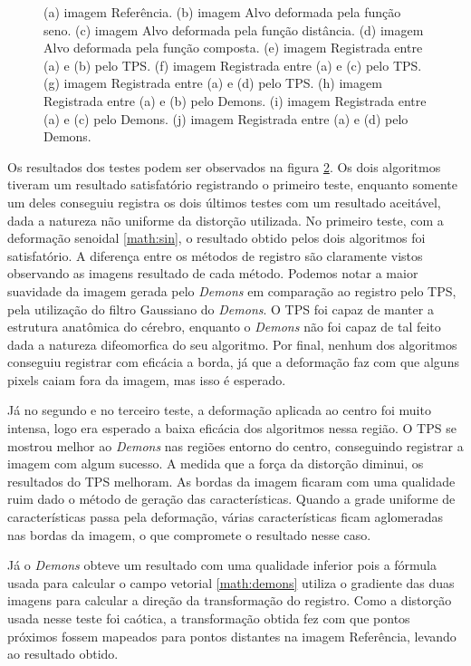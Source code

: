 \begin{figure}[h]
\begin{subfigure}[t]{0.25\textwidth}
	  \label{fig:sindist-image-demon}
	\end{subfigure}
	\caption{(a) imagem Referência. (b) imagem Alvo deformada pela função seno. (c) imagem Alvo deformada pela função 
			distância. (d) imagem Alvo deformada pela função composta. (e) imagem Registrada entre (a) e (b) pelo TPS. 
			(f) imagem Registrada entre (a) e (c) pelo TPS. (g) imagem Registrada entre (a) e (d) pelo TPS. (h) imagem 
			Registrada entre (a) e (b) pelo Demons. (i) imagem Registrada entre (a) e (c) pelo Demons. (j) imagem 
			Registrada entre (a) e (d) pelo Demons.}
	\label{fig:resultados}
\end{figure}
	Os resultados dos testes podem ser observados na figura \ref{fig:resultados}.
Os dois algoritmos tiveram um resultado satisfatório registrando o primeiro teste, enquanto somente um deles conseguiu
registra os dois últimos testes com um resultado aceitável, dada a natureza não uniforme da distorção utilizada. 
No primeiro teste, com a deformação senoidal \ref{math:sin}, o resultado obtido pelos dois algoritmos foi satisfatório.
A diferença entre os métodos de registro são claramente vistos observando as imagens resultado de cada método. Podemos
notar a maior suavidade da imagem gerada pelo \textit{Demons} em comparação ao registro pelo TPS, pela utilização do
filtro Gaussiano do \textit{Demons}. O TPS foi capaz de manter a estrutura anatômica do cérebro, enquanto o 
\textit{Demons} não foi capaz de tal feito dada a natureza difeomorfica do seu algoritmo. Por final, nenhum dos 
algoritmos conseguiu registrar com eficácia a borda, já que a deformação faz com que alguns pixels caiam fora da 
imagem, mas isso é esperado.

  Já no segundo e no terceiro teste, a deformação aplicada ao centro foi muito intensa, logo era esperado a baixa 
eficácia dos algoritmos nessa região. O TPS se mostrou melhor ao \textit{Demons} nas regiões entorno do centro, 
conseguindo registrar a imagem com algum sucesso. A medida que a força da distorção diminui, os resultados do TPS 
melhoram. As bordas da imagem ficaram com uma qualidade ruim dado o método de geração das características. Quando a 
grade uniforme de características passa pela deformação, várias características ficam aglomeradas nas bordas da imagem, 
o que compromete o resultado nesse caso.

	Já o \textit{Demons} obteve um resultado com uma qualidade inferior pois a fórmula usada para calcular o campo 
vetorial \ref{math:demons} utiliza o gradiente das duas imagens para calcular a direção da transformação do registro. 
Como a distorção usada nesse teste foi caótica, a transformação obtida fez com que pontos próximos fossem mapeados para 
pontos distantes na imagem Referência, levando ao resultado obtido.